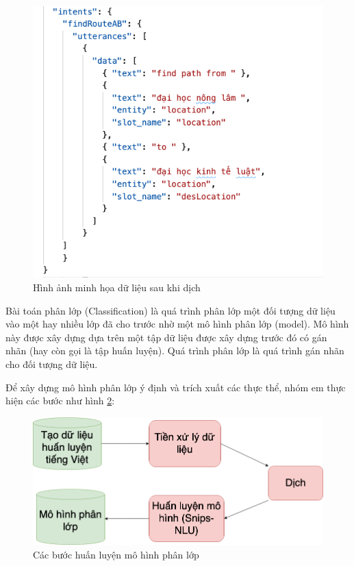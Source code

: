 \begin{figure}[H]
    \centering
    \includegraphics[width=15cm]{images/Data-train-ex.png}
    \caption{Hình ảnh minh họa dữ liệu sau khi dịch}
    \label{fig:data-train-en} 
\end{figure}


Bài toán phân lớp (Classification) là quá trình phân lớp một đối tượng dữ liệu vào một hay nhiều lớp đã cho trước nhờ một mô hình phân lớp (model). Mô hình này được xây dựng dựa trên một tập dữ liệu được xây dựng trước đó có gán nhãn (hay còn gọi là tập huấn luyện). Quá trình phân lớp là quá trình gán nhãn cho đối tượng dữ liệu.



Để xây dựng mô hình phân lớp ý định và trích xuất các thực thể, nhóm em thực hiện các bước như hình \ref{fig:FlowTrainingData}:

\begin{figure}[H]
    \centering
    \includegraphics[width=15cm]{images/FlowTrainingData.png}
    \caption{Các bước huấn luyện mô hình phân lớp}
    \label{fig:FlowTrainingData}
\end{figure}

